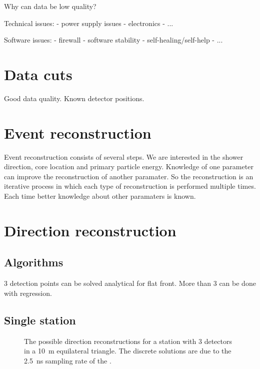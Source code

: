 Why can data be low quality?

Technical issues:
- power supply issues
- electronics
- ...

Software issues:
- firewall
- software stability
- self-healing/self-help
- ...


\section{Data cuts}

Good data quality.
Known detector positions.


\section{Event reconstruction}

Event reconstruction consists of several steps. We are interested in the
shower direction, core location and primary particle energy. Knowledge
of one  parameter can improve the reconstruction of another paramater.
So the reconstruction is an iterative process in which each type of
reconstruction is performed multiple times. Each time better knowledge
about other paramaters is known.


\section{Direction reconstruction}

\subsection{Algorithms}

3 detection points can be solved analytical for flat front.
More than 3 can be done with regression.

\subsection{Single station}

\begin{figure}
    \centering
    
    \caption{ The possible
             direction reconstructions for a station with 3 detectors in
             a \SI{10}{\meter} equilateral triangle. The discrete
             solutions are due to the \SI{2.5}{\nano\second} sampling
             rate of the \adcs.}
    \label{fig:discrete_directions}
\end{figure}



